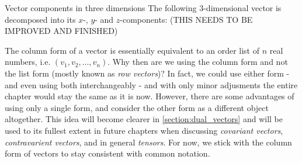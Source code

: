 \begin{example}{Vector components in three dimensions}{}
	The following $3$-dimensional vector is decomposed into its $x$-, $y$- and $z$-components:
	(THIS NEEDS TO BE IMPROVED AND FINISHED)

	\centering
\end{example}

The column form of a vector is essentially equivalent to an order list of $n$ real numbers, i.e. $(v_{1},v_{2},\dots,v_{n})$. Why then are we using the column form and not the list form (mostly known as \emph{row vectors})? In fact, we could use either form - and even using both interchangeably - and with only minor adjusments the entire chapter would stay the same as it is now. However, there are some advantages of using only a single form, and consider the other form as a different object altogether. This idea will become clearer in \autoref{section:dual_vectors} and will be used to its fullest extent in future chapters when discussing \emph{covariant vectors}, \emph{contravarient vectors}, and in general \emph{tensors}. For now, we stick with the column form of vectors to stay consistent with common notation.

